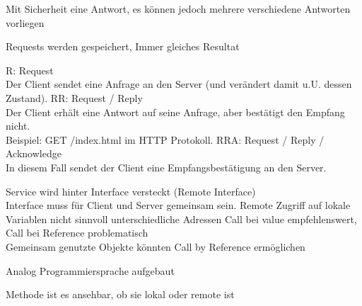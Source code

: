 \documentclass[ngerman,a4paper,12pt]{scrreprt}
\begin{document}

Mit Sicherheit eine Antwort, es können jedoch mehrere verschiedene Antworten vorliegen

Requests werden gespeichert, Immer gleiches Resultat


\ul
	\li R: Request \\ Der Client sendet eine Anfrage an den Server (und verändert damit
u.U. dessen Zustand).
	\li RR: Request / Reply\\Der Client erhält eine Antwort auf seine Anfrage, aber bestätigt den
Empfang nicht.\\Beispiel: GET /index.html im HTTP Protokoll.
	 \li RRA: Request / Reply / Acknowledge\\In diesem Fall sendet der Client eine Empfangsbestätigung an den
Server.
\ulE

\ul
	\li Service wird hinter Interface versteckt (Remote Interface) \\
	\ra Interface muss für Client und Server gemeinsam sein.
	\li Remote Zugriff auf lokale Variablen nicht sinnvoll \ra unterschiedliche Adressen
	\li Call bei value empfehlenswert, Call bei Reference problematisch\\
	\ra Gemeinsam genutzte Objekte könnten Call by Reference ermöglichen
\ulE

\ul
	\li Analog Programmiersprache aufgebaut
\ulE



\ul
	\li Methode ist es ansehbar, ob sie lokal oder remote ist
	\li 
\ulE
{}

\end{document}
